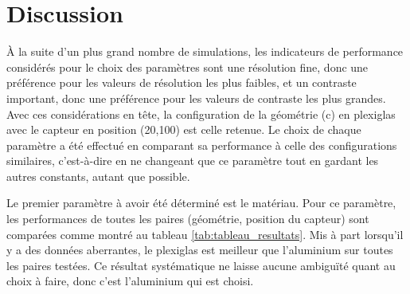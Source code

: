 \documentclass[conference]{IEEEtran}
\begin{document}


\section{Discussion}

À la suite d'un plus grand nombre de simulations, les indicateurs de performance 
considérés pour le choix des paramètres sont une résolution fine, donc une 
préférence pour les valeurs de résolution les plus faibles, et un contraste 
important, donc une préférence pour les valeurs de contraste les plus grandes.
Avec ces considérations en tête, la configuration de la géométrie (c) en plexiglas 
avec le capteur en position (20,100) est celle retenue. Le choix de chaque paramètre
a été effectué en comparant sa performance à celle des configurations similaires, 
c'est-à-dire en ne changeant que ce paramètre tout en gardant les autres constants,
autant que possible.

Le premier paramètre à avoir été déterminé est le matériau. Pour ce paramètre, 
les performances de toutes les paires (géométrie, position du capteur) sont 
comparées comme montré au tableau \ref{tab:tableau_resultats}. Mis à part lorsqu'il y a des données aberrantes, le plexiglas est 
meilleur que l'aluminium sur toutes les paires testées. Ce résultat systématique 
ne laisse aucune ambiguïté quant au choix à faire, donc c'est l'aluminium qui est 
choisi.
\end{document}
